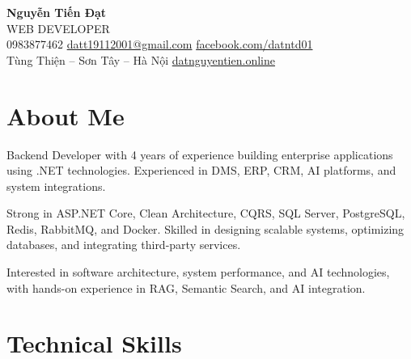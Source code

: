 \documentclass[a4paper,10pt]{article}
\newcommand{\infoitem}[2]{%
    \textcolor{primary}{#1}\hspace{0.3em}\textcolor{mediumtext}{#2}%
}
\begin{document}
\begin{center}
    {\Huge\bfseries\color{darktext} Nguyễn Tiến Đạt}\\[0.3em]
    {\Large\color{primary} WEB DEVELOPER}\\[0.8em]
    \infoitem{\faPhone}{0983877462} \quad
    \infoitem{\faEnvelope}{\href{mailto:datt19112001@gmail.com}{datt19112001@gmail.com}} \quad
    \infoitem{\faFacebook}{\href{https://facebook.com/datntd01}{facebook.com/datntd01}} \\[0.3em]
    \infoitem{\faMapMarkerAlt}{Tùng Thiện -- Sơn Tây -- Hà Nội} \quad
    \infoitem{\faGlobe}{\href{https://datnguyentien.online}{datnguyentien.online}}
\end{center}

\vspace{0.5em}

\section{About Me}

Backend Developer with 4 years of experience building enterprise applications using .NET technologies. Experienced in DMS, ERP, CRM, AI platforms, and system integrations.

Strong in ASP.NET Core, Clean Architecture, CQRS, SQL Server, PostgreSQL, Redis, RabbitMQ, and Docker. Skilled in designing scalable systems, optimizing databases, and integrating third-party services.

Interested in software architecture, system performance, and AI technologies, with hands-on experience in RAG, Semantic Search, and AI integration.

\section{Technical Skills}
\end{document}

